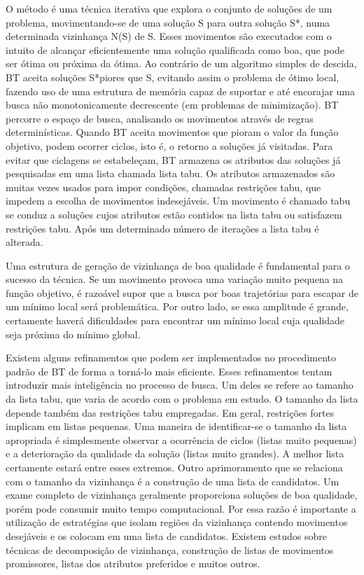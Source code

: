 O método é uma técnica iterativa que explora o conjunto de soluções de um problema, movimentando-se de uma solução S para outra solução S*, numa determinada vizinhança N(S) de S. Esses movimentos são executados com o intuito de alcançar eficientemente uma solução qualificada como boa, que pode ser ótima ou próxima da ótima. Ao contrário de um algoritmo simples de descida, BT aceita soluções S*piores que S, evitando assim o problema de ótimo local, fazendo uso de uma estrutura de memória capaz de suportar e até encorajar uma busca não monotonicamente decrescente (em problemas de minimização). BT percorre o espaço de busca, analisando os movimentos através de regras determinísticas. Quando BT aceita movimentos que pioram o valor da função objetivo, podem ocorrer ciclos, isto é, o retorno a soluções já visitadas. Para evitar que ciclagens se estabeleçam, BT armazena os atributos das soluções já pesquisadas em uma lista chamada lista tabu. Os atributos armazenados são muitas vezes usados para impor condições, chamadas restrições tabu, que impedem a escolha de movimentos indesejáveis. Um movimento é chamado tabu se conduz a soluções cujos atributos estão contidos na lista tabu ou satisfazem restrições tabu. Após um determinado número de iterações a lista tabu é alterada. 


Uma estrutura de geração de vizinhança de boa qualidade é fundamental para o sucesso da técnica. Se um movimento provoca uma variação muito pequena na função objetivo, é razoável supor que a busca por boas trajetórias para escapar de um mínimo local será problemática. Por outro lado, se essa amplitude é grande, certamente haverá dificuldades para encontrar um mínimo local cuja qualidade seja próxima do mínimo global. 


Existem alguns refinamentos que podem ser implementados no procedimento padrão de BT de forma a torná-lo mais eficiente. Esses refinamentos tentam introduzir mais inteligência no processo de busca. Um deles se refere ao tamanho da lista tabu, que varia de acordo com o problema em estudo. O tamanho da lista depende também das restrições tabu empregadas. Em geral, restrições fortes implicam em listas pequenas. Uma maneira de identificar-se o tamanho da lista apropriada é simplesmente observar a ocorrência de ciclos (listas muito pequenas) e a deterioração da qualidade da solução (listas muito grandes). A melhor lista certamente estará entre esses extremos. Outro aprimoramento que se relaciona com o tamanho da vizinhança é a construção de uma lista de candidatos. Um exame completo de vizinhança geralmente proporciona soluções de boa qualidade, porém pode consumir muito tempo computacional. Por essa razão é importante a utilização de estratégias que isolam regiões da vizinhança contendo movimentos desejáveis e os colocam em uma lista de candidatos. Existem estudos sobre técnicas de decomposição de vizinhança, construção de listas de movimentos promissores, listas dos atributos preferidos e muitos outros. 


